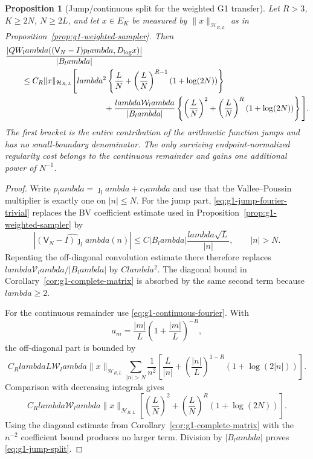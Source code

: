 \documentclass[11pt]{article}
\def\lambda{lambda}%
\newtheorem{proposition}[theorem]{Proposition}
\theoremstyle{remark}
\begin{document}
\begin{proposition}[Jump/continuous split for the weighted G1 transfer]\label{prop:g1-jump-split}
Let $R>3$, $K\ge2N$, $N\ge2L$, and let $x\in E_K$ be measured by
$\|x\|_{\mathcal H_{R,L}}$ as in
Proposition~\ref{prop:g1-weighted-sampler}.  Then
\begin{align}
 &\frac{
 |QW_\lambda((\mathsf V_N-I)p_\lambda,D_{\log}x)|
 }{|B_\lambda|}
 \notag\\
 &\qquad\le C_R\|x\|_{\mathcal H_{R,L}}
 \Bigg[
 \lambda^2\left\{
 \frac LN+
 \left(\frac LN\right)^{R-1}(1+\log(2N))
 \right\}
 \label{eq:g1-jump-split}\\
 &\hspace{43mm}
 +\frac{\lambda\mathcal W_\lambda}{|B_\lambda|}
 \left\{
 \left(\frac LN\right)^2+
 \left(\frac LN\right)^R(1+\log(2N))
 \right\}
 \Bigg].\notag
\end{align}
The first bracket is the entire contribution of the arithmetic function jumps
and has no small-boundary denominator.  The only surviving endpoint-normalized
regularity cost belongs to the continuous remainder and gains one additional
power of $N^{-1}$.
\end{proposition}
\begin{proof}
Write
$p_\lambda=\jmath_\lambda+c_\lambda$ and use that the
Vallee--Poussin multiplier is exactly one on $|n|\le N$.  For the jump part,
\eqref{eq:g1-jump-fourier-trivial} replaces the BV coefficient estimate used
in Proposition~\ref{prop:g1-weighted-sampler} by
\[
 |\widehat{(\mathsf V_N-I)\jmath_\lambda}(n)|
 \le C|B_\lambda|\frac{\lambda\sqrt L}{|n|},
 \qquad |n|>N.
\]
Repeating the off-diagonal convolution estimate there therefore replaces
$\lambda\mathcal V_\lambda/|B_\lambda|$ by $C\lambda^2$.  The diagonal
bound in Corollary~\ref{cor:g1-complete-matrix} is absorbed by the same
second term because $\lambda\ge2$.

For the continuous remainder use \eqref{eq:g1-continuous-fourier}.  With
\[
 a_m=\frac{|m|}{L}\left(1+\frac{|m|}{L}\right)^{-R},
\]
the off-diagonal part is bounded by
\[
 C_R\lambda L\mathcal W_\lambda
 \|x\|_{\mathcal H_{R,L}}
 \sum_{|n|>N}\frac1{n^2}
 \left[
 \frac L{|n|}+
 \left(\frac{|n|}{L}\right)^{1-R}
 (1+\log(2|n|))
 \right].
\]
Comparison with decreasing integrals gives
\[
 C_R\lambda\mathcal W_\lambda
 \|x\|_{\mathcal H_{R,L}}
 \left[
 \left(\frac LN\right)^2+
 \left(\frac LN\right)^R(1+\log(2N))
 \right].
\]
Using the diagonal estimate from
Corollary~\ref{cor:g1-complete-matrix} with the $n^{-2}$ coefficient bound
produces no larger term.  Division by $|B_\lambda|$ proves
\eqref{eq:g1-jump-split}.
\end{proof}
\end{document}
